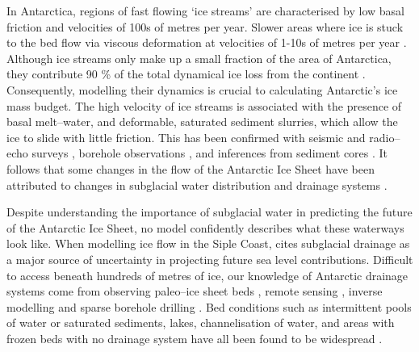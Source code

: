 In Antarctica, regions of fast flowing `ice streams'  are characterised by low basal friction and velocities of 100s of metres per year. Slower areas where ice is stuck to the bed flow via viscous deformation at velocities of 1-10s of metres per year \citep{rignot2011ice, morlighem2013inversion}.
Although ice streams only make up a small fraction of the area of  Antarctica, they contribute 90 \% of the total dynamical ice loss from the continent \citep{bamber2000widespread, rignot2011ice}.  Consequently, modelling their dynamics is crucial to calculating Antarctic's ice mass budget. The high velocity of ice streams is associated with the presence of basal melt--water, and deformable, saturated sediment slurries, which allow the ice to slide with little friction. This has been confirmed with seismic \citep{blankenship1986seismic, alley1987till} and radio--echo surveys \citep{robin1970radio}, borehole observations  \citep{engelhardt1997basal}, and inferences from sediment cores \citep{hodson2016physical}.
It follows that some changes in the flow of the Antarctic Ice Sheet have been attributed to changes in subglacial water distribution and drainage systems \citep{alley1994water}.

Despite understanding the importance of subglacial water in predicting the future of the Antarctic Ice Sheet, no model confidently describes what these waterways look like. When modelling ice flow in the Siple Coast, \cite{bougamont2015reactivation} cites subglacial drainage as a major source of uncertainty in projecting future sea level contributions.
Difficult to access beneath hundreds of metres of ice, our  knowledge of Antarctic drainage systems come from observing paleo--ice sheet beds \citep{hattestrand1997ribbed, lewis2006age}, remote sensing \citep{schroeder2013evidence}, inverse modelling \citep{morlighem2013inversion} and sparse borehole drilling \citep{engelhardt1997basal}.
Bed conditions such as intermittent pools of water or saturated
sediments, lakes, channelisation of water, and areas with frozen beds with no drainage system have all been found to be widespread \citep{carter2009using, schroeder2013evidence, young2016distribution}. 

